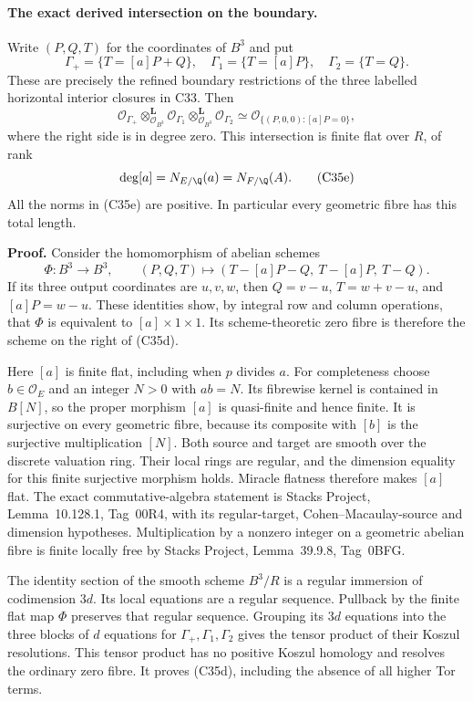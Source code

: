 \paragraph{The exact derived intersection on the boundary.}
Write $(P,Q,T)$ for the coordinates of $B^3$ and put
\[
 \Gamma_+=\{T=[a]P+Q\},\quad
 \Gamma_1=\{T=[a]P\},\quad
 \Gamma_2=\{T=Q\}.
\]
These are precisely the refined boundary restrictions of the
three labelled horizontal interior closures in C33. Then
\[
 \mathcal O_{\Gamma_+}
       \mathbin{\otimes}^{\mathbf L}_{\mathcal O_{B^3}}
 \mathcal O_{\Gamma_1}
       \mathbin{\otimes}^{\mathbf L}_{\mathcal O_{B^3}}
 \mathcal O_{\Gamma_2}
 \simeq \mathcal O_{\{(P,0,0):[a]P=0\}},
 \tag{C35d}
\]
where the right side is in degree zero. This intersection is
finite flat over $R$, of rank
\[
       \deg[a]=N_{E/\Q}(a)=N_{F/\Q}(A).
 \tag{C35e}
\]
All the norms in (C35e) are positive. In particular every
geometric fibre has this total length.

\textbf{Proof.}
Consider the homomorphism of abelian schemes
\[
 \Phi:B^3\longrightarrow B^3,\qquad
 (P,Q,T)\longmapsto
       (T-[a]P-Q,\ T-[a]P,\ T-Q).
 \tag{C35f}
\]
If its three output coordinates are $u,v,w$, then
$Q=v-u$, $T=w+v-u$, and $[a]P=w-u$.
These identities show, by integral row and column operations,
that $\Phi$ is equivalent to $[a]\times1\times1$.
Its scheme-theoretic zero fibre is therefore the scheme on
the right of (C35d).

Here $[a]$ is finite flat, including when $p$ divides $a$.
For completeness choose $b\in\mathcal O_E$ and an integer
$N>0$ with $ab=N$. Its fibrewise kernel is contained in
$B[N]$, so the proper morphism $[a]$ is quasi-finite and
hence finite. It is surjective on every geometric fibre,
because its composite with $[b]$ is the surjective
multiplication $[N]$. Both source and target are smooth
over the discrete valuation ring. Their local rings are
regular, and the dimension equality for this finite
surjective morphism holds. Miracle flatness therefore
makes $[a]$ flat. The exact commutative-algebra statement
is Stacks Project, Lemma~10.128.1, Tag~00R4, with its
regular-target, Cohen--Macaulay-source and dimension
hypotheses. Multiplication by a nonzero integer on a
geometric abelian fibre is finite locally free by
Stacks Project, Lemma~39.9.8, Tag~0BFG.

The identity section of the smooth scheme $B^3/R$ is a
regular immersion of codimension $3d$. Its local equations
are a regular sequence. Pullback by the finite flat map
$\Phi$ preserves that regular sequence. Grouping its
$3d$ equations into the three blocks of $d$ equations
for $\Gamma_+,\Gamma_1,\Gamma_2$ gives the tensor product
of their Koszul resolutions. This tensor product has no
positive Koszul homology and resolves the ordinary zero
fibre. It proves (C35d), including the absence of all
higher Tor terms.

